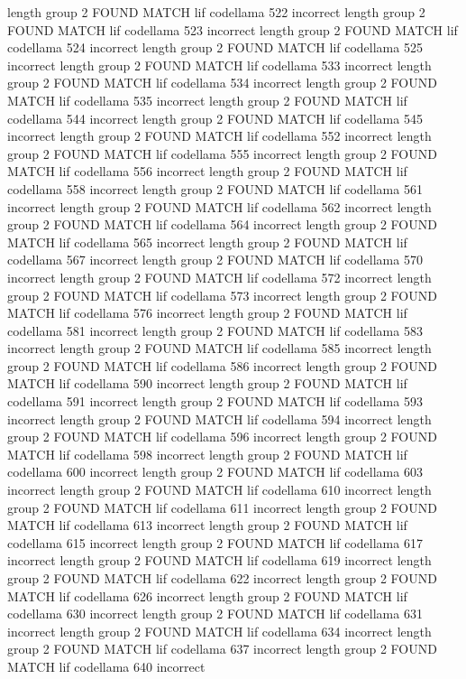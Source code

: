 length group  2
FOUND MATCH lif codellama 522 incorrect
length group  2
FOUND MATCH lif codellama 523 incorrect
length group  2
FOUND MATCH lif codellama 524 incorrect
length group  2
FOUND MATCH lif codellama 525 incorrect
length group  2
FOUND MATCH lif codellama 533 incorrect
length group  2
FOUND MATCH lif codellama 534 incorrect
length group  2
FOUND MATCH lif codellama 535 incorrect
length group  2
FOUND MATCH lif codellama 544 incorrect
length group  2
FOUND MATCH lif codellama 545 incorrect
length group  2
FOUND MATCH lif codellama 552 incorrect
length group  2
FOUND MATCH lif codellama 555 incorrect
length group  2
FOUND MATCH lif codellama 556 incorrect
length group  2
FOUND MATCH lif codellama 558 incorrect
length group  2
FOUND MATCH lif codellama 561 incorrect
length group  2
FOUND MATCH lif codellama 562 incorrect
length group  2
FOUND MATCH lif codellama 564 incorrect
length group  2
FOUND MATCH lif codellama 565 incorrect
length group  2
FOUND MATCH lif codellama 567 incorrect
length group  2
FOUND MATCH lif codellama 570 incorrect
length group  2
FOUND MATCH lif codellama 572 incorrect
length group  2
FOUND MATCH lif codellama 573 incorrect
length group  2
FOUND MATCH lif codellama 576 incorrect
length group  2
FOUND MATCH lif codellama 581 incorrect
length group  2
FOUND MATCH lif codellama 583 incorrect
length group  2
FOUND MATCH lif codellama 585 incorrect
length group  2
FOUND MATCH lif codellama 586 incorrect
length group  2
FOUND MATCH lif codellama 590 incorrect
length group  2
FOUND MATCH lif codellama 591 incorrect
length group  2
FOUND MATCH lif codellama 593 incorrect
length group  2
FOUND MATCH lif codellama 594 incorrect
length group  2
FOUND MATCH lif codellama 596 incorrect
length group  2
FOUND MATCH lif codellama 598 incorrect
length group  2
FOUND MATCH lif codellama 600 incorrect
length group  2
FOUND MATCH lif codellama 603 incorrect
length group  2
FOUND MATCH lif codellama 610 incorrect
length group  2
FOUND MATCH lif codellama 611 incorrect
length group  2
FOUND MATCH lif codellama 613 incorrect
length group  2
FOUND MATCH lif codellama 615 incorrect
length group  2
FOUND MATCH lif codellama 617 incorrect
length group  2
FOUND MATCH lif codellama 619 incorrect
length group  2
FOUND MATCH lif codellama 622 incorrect
length group  2
FOUND MATCH lif codellama 626 incorrect
length group  2
FOUND MATCH lif codellama 630 incorrect
length group  2
FOUND MATCH lif codellama 631 incorrect
length group  2
FOUND MATCH lif codellama 634 incorrect
length group  2
FOUND MATCH lif codellama 637 incorrect
length group  2
FOUND MATCH lif codellama 640 incorrect
